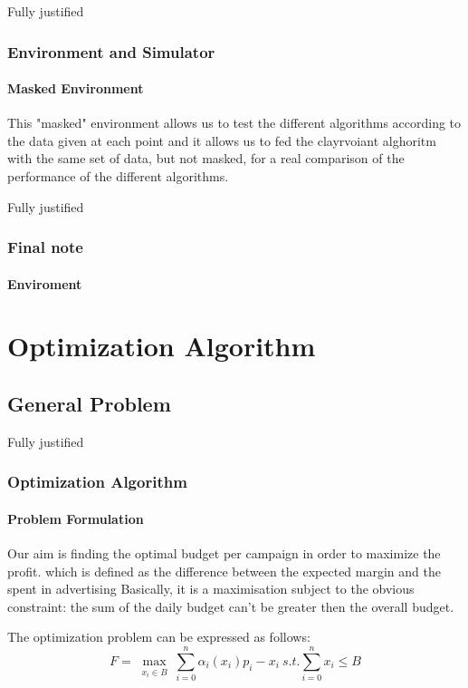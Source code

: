 \documentclass{beamer}
\begin{document}
\begin {frame}{Fully justified}

\frametitle{Environment and Simulator}
\framesubtitle{Masked Environment}

This "masked" environment allows us to test the different algorithms according to the data given 
at each point and it allows us to fed the clayrvoiant alghoritm with the same set of data, 
but not masked, for a real comparison of the performance of the different algorithms.

\end{frame}


\begin {frame}{Fully justified}

\frametitle{Final note}
\framesubtitle{Enviroment}


\end{frame}



\AtBeginSection[]
{
\begin{frame}{}
    \tableofcontents[currentsection]
\end{frame}
}

\section{Optimization Algorithm}

\subsection{General Problem}

\begin{frame}{Fully justified}

\frametitle{Optimization Algorithm}
\framesubtitle{Problem Formulation}
Our aim is finding the optimal budget per campaign in order to maximize the profit.
which is defined as the difference between the expected margin and the spent in advertising
Basically, it is a maximisation subject to the obvious constraint: the sum of the daily budget can't be greater then the overall budget.

The optimization problem can be expressed as follows:
\begin{displaymath}
F=\max_{\substack{x_i\in B}} \sum_{i=0}^n \alpha_i(x_i)p_i-x_i \ s.t. \sum_{i=0}^n x_i\leq B
\end{displaymath}

\end{frame}
\end{document}

